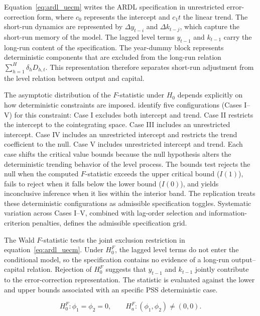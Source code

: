 \documentclass[11pt]{article}
\begin{document}
Equation~\eqref{eq:ardl_uecm} writes the ARDL specification in unrestricted error-correction form, where $c_0$ represents the intercept and $c_1t$ the linear trend. The short-run dynamics are represented by $\Delta y_{t-i}$ and $\Delta k_{t-j}$, which capture the short-run memory of the model. The lagged level terms $y_{t-1}$ and $k_{t-1}$ carry the long-run content of the specification. The year-dummy block represents deterministic components that are excluded from the long-run relation $\sum_{h=1}^{H}\delta_h D_{h,t}$. This representation therefore separates short-run adjustment from the level relation between output and capital.

The asymptotic distribution of the $F$-statistic under $H_0$ depends explicitly on how deterministic constraints are imposed. \citet{Pesaran2001} identify five configurations (Cases I--V) for this constraint: Case I excludes both intercept and trend. Case II restricts the intercept to the cointegrating space. Case III includes an unrestricted intercept. Case IV includes an unrestricted intercept and restricts the trend coefficient to the null. Case V includes unrestricted intercept and trend. Each case shifts the critical value bounds because the null hypothesis alters the deterministic trending behavior of the level process. The bounds test rejects the null when the computed $F$-statistic exceeds the upper critical bound ($I(1)$), fails to reject when it falls below the lower bound ($I(0)$), and yields inconclusive inference when it lies within the interior band. The replication treats these deterministic configurations as admissible specification toggles. Systematic variation across Cases I--V, combined with lag-order selection and information-criterion penalties, defines the admissible specification grid.

The Wald $F$-statistic tests the joint exclusion restriction in equation~\eqref{eq:ardl_uecm}. Under $H_{0}^{F}$, the lagged level terms do not enter the conditional model, so the specification contains no evidence of a long-run output--capital relation. Rejection of $H_{0}^{F}$ suggests that $y_{t-1}$ and $k_{t-1}$ jointly contribute to the error-correction representation. The statistic is evaluated against the lower and upper bounds associated with an specific PSS deterministic case.

\begin{equation}
H_{0}^{F}: \phi_1=\phi_2=0,
\qquad
H_{a}^{F}: (\phi_1,\phi_2)\neq(0,0).
\label{eq:fbounds_hypothesis}
\end{equation}
\end{document}
